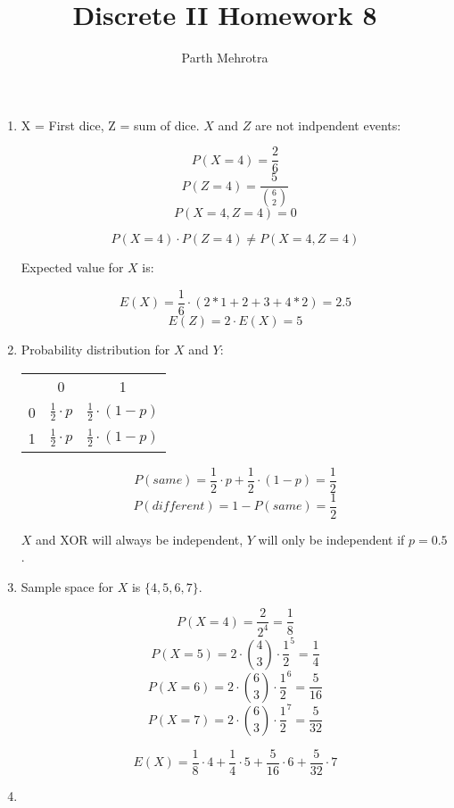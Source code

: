 \documentclass{article}
\begin{document}
	\title{Discrete II Homework 8}
	\author{Parth Mehrotra}
	\maketitle

	\begin{enumerate}

		\item 
			X = First dice, Z = sum of dice. \(X\) and \(Z\) are not indpendent events:
			
			\[ P(X=4) = \frac{2}{6} \] 
			\[ P(Z=4) = \frac{5}{\binom{6}{2}} \]
			\[ P(X=4, Z=4) = 0 \]

			\[ P(X=4) \cdot P(Z=4) \neq P(X=4, Z=4) \]

			Expected value for \(X\) is:
			
			\[E(X) = \frac{1}{6} \cdot (2*1 + 2 + 3 + 4*2) = 2.5 \] 
			\[E(Z) = 2 \cdot E(X) = 5\]

		\item
			Probability distribution for \(X\) and \(Y\): 
			\begin{center}
				\begin{tabular}{ c c c }
					  & 0 & 1 \\
					0 & \( \frac{1}{2} \cdot p \) & \( \frac{1}{2} \cdot (1-p) \) \\
					1 & \( \frac{1}{2} \cdot p \) & \( \frac{1}{2} \cdot (1-p) \) \\
				\end{tabular}
			\end{center}

			\[ P(same) = \frac{1}{2} \cdot p + \frac{1}{2} \cdot (1-p) = \frac{1}{2}\]
			\[ P(different) = 1 - P(same) = \frac{1}{2} \]

			\(X\) and XOR will always be independent, \(Y\) will only be independent if \(p=0.5\).

		\item
			Sample space for \(X\) is \(\{4, 5, 6, 7\}\).
			
			\[P(X=4) = \frac{2}{2^4} = \frac{1}{8} \]
			\[P(X=5) = 2 \cdot \binom{4}{3} \cdot \frac{1}{2}^5 = \frac{1}{4} \] 
			\[P(X=6) = 2 \cdot \binom{6}{3} \cdot \frac{1}{2}^6 = \frac{5}{16} \]
			\[P(X=7) = 2 \cdot \binom{6}{3} \cdot \frac{1}{2}^7 = \frac{5}{32} \]

			\[ E(X) = \frac{1}{8} \cdot 4 + \frac{1}{4} \cdot 5 + \frac{5}{16} \cdot 6 + \frac{5}{32} \cdot 7 \]

		\item
			

	\end{enumerate}
\end{document}

